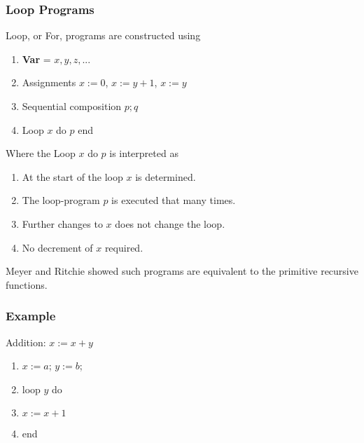 \documentclass{beamer}
\theoremstyle{indentDefn} \newtheorem{defn}[]{Definition}
\begin{document}
\begin{frame}
	\frametitle{Loop Programs}

	Loop, or For, programs are constructed using 

	\begin{enumerate}
		\item[] {\bf Var} = $x,y,z,...$
		\item[] Assignments $x:=0$, $x:=y+1$, $x:=y$
		\item[] Sequential composition $p;q$
		\item[] Loop $x$ do $p$ end
	\end{enumerate}

	Where the Loop $x$ do $p$ is interpreted as

	\begin{enumerate}
		\item[] At the start of the loop $x$ is determined.
		\item[] The loop-program $p$ is executed that many times. 
		\item[] Further changes to $x$ does not change the loop. 
		\item[] No decrement of $x$ required. 
	\end{enumerate}

	Meyer and Ritchie showed such programs are equivalent to the primitive recursive functions. 

\end{frame}

\begin{frame}
	\frametitle{Example}

	Addition: $x:= x + y$ 
	
	\vspace{0.5cm}

	\begin{enumerate}
		\item[] $x := a$; $y := b$;
		\item[] loop $y$ do 
		\item[] \hspace{0.5cm} $x := x + 1$
		\item[] end
	\end{enumerate}

	\vspace{5cm}



\end{frame}
\end{document}

